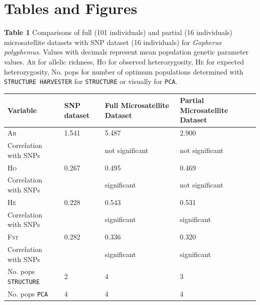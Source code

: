 \documentclass[english]{article}\usepackage[]{graphicx}\usepackage[]{color}
\begin{document}
\section*{Tables and Figures}
\noindent
\textbf{Table 1} Comparisons of full (101 individuals) and partial (16 individuals) microsatellite datasets with SNP dataset (16 individuals) for \textit{Gopherus polyphemus}. Values with decimals represent mean population genetic parameter values. \textsc{Ar} for allelic richness, \textsc{Ho} for observed heterozygosity, \textsc{He} for expected heterozygosity, No. pops for number of optimum populations determined with \texttt{STRUCTURE HARVESTER} for \texttt{STRUCTURE} or visually for \texttt{PCA}. \\
\begin{table}[ht]
\centering
\begin{tabular}{llll}
\hline
Variable & SNP dataset & Full Microsatellite Dataset & Partial Microsatellite Dataset \\ 
\hline
\textsc{Ar}           & 1.541  & 5.487           & 2.900           \\
Correlation with SNPs &        & not significant & not significant \\
\hline
\textsc{Ho}           & 0.267  & 0.495           & 0.469           \\
Correlation with SNPs &        & significant     & not significant \\
\hline
\textsc{He}           & 0.228  & 0.543    & 0.531                  \\
Correlation with SNPs &        & significant     & significant     \\
\hline
\textsc{Fst}          & 0.282  & 0.336    & 0.320                  \\
Correlation with SNPs &        & significant     & significant     \\
\hline
No. pops \texttt{STRUCTURE} & 2 & 4 & 3                            \\
\hline
No. pops \texttt{PCA} & 4 & 4 & 4                                  \\
\hline
\end{tabular}
\end{table}
\end{document}
